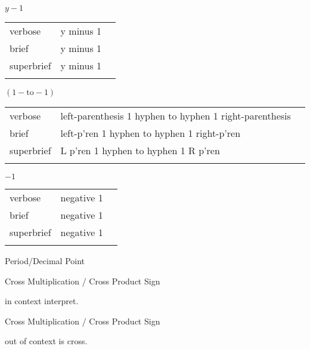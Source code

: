 
\label{sec:symbols}

\R
\E $y-1$

\begin{longtable}[c]{@{}lll@{}}
\toprule\addlinespace
verbose & y minus 1 &

\\\addlinespace
brief & y minus 1 &

\\\addlinespace
superbrief & y minus 1 &

\\\addlinespace
\bottomrule
\end{longtable}

\E $(1-\mathrm{to}-1)$

\begin{longtable}[c]{@{}lll@{}}
\toprule\addlinespace
verbose & left-parenthesis 1 hyphen to hyphen 1 right-parenthesis &

\\\addlinespace
brief & left-p'ren 1 hyphen to hyphen 1 right-p'ren &

\\\addlinespace
superbrief & L p'ren 1 hyphen to hyphen 1 R p'ren &

\\\addlinespace
\bottomrule
\end{longtable}

\E $-1$

\begin{longtable}[c]{@{}lll@{}}
\toprule\addlinespace
verbose & negative 1 &

\\\addlinespace
brief & negative 1 &

\\\addlinespace
superbrief & negative 1 &

\\\addlinespace
\bottomrule
\end{longtable}

\R

Period/Decimal Point

\R

Cross Multiplication / Cross Product Sign

in context interpret.

\R


Cross Multiplication / Cross Product Sign

out of context is cross.


